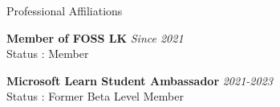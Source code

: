 \documentclass[
	11pt, %
]{./assets/resume} %
\begin{document}





\begin{rSection}{Professional Affiliations}

	\textbf{Member of FOSS LK} \hfill \textit{Since 2021} \\ 
	Status : Member

	\textbf{Microsoft Learn Student Ambassador} \hfill \textit{2021-2023} \\ 
	Status : Former Beta Level Member

\end{rSection}





\end{document}
